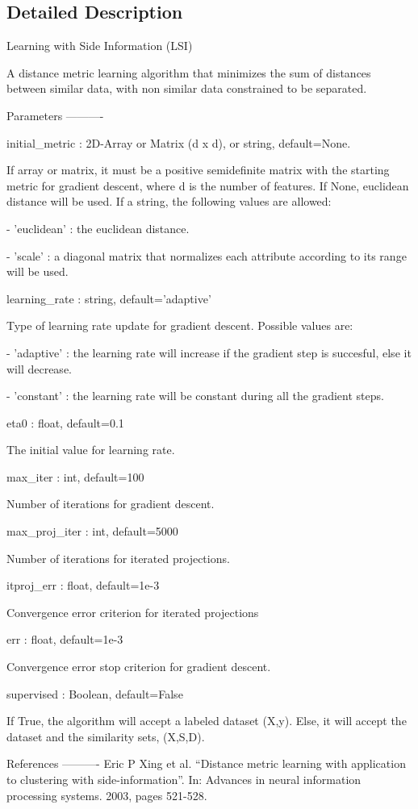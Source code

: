 \subsection{Detailed Description}
\begin{DoxyVerb}Learning with Side Information (LSI)

A distance metric learning algorithm that minimizes the sum of distances between similar data, with non similar
data constrained to be separated.

Parameters
----------

initial_metric : 2D-Array or Matrix (d x d), or string, default=None.

    If array or matrix, it must be a positive semidefinite matrix with the starting metric for gradient descent, where d is the number of features.
    If None, euclidean distance will be used. If a string, the following values are allowed:

    - 'euclidean' : the euclidean distance.

    - 'scale' : a diagonal matrix that normalizes each attribute according to its range will be used.

learning_rate : string, default='adaptive'

    Type of learning rate update for gradient descent. Possible values are:

    - 'adaptive' : the learning rate will increase if the gradient step is succesful, else it will decrease.

    - 'constant' : the learning rate will be constant during all the gradient steps.

eta0 : float, default=0.1

    The initial value for learning rate.

max_iter : int, default=100

    Number of iterations for gradient descent.

max_proj_iter : int, default=5000

    Number of iterations for iterated projections.

itproj_err : float, default=1e-3

    Convergence error criterion for iterated projections

err : float, default=1e-3

    Convergence error stop criterion for gradient descent.

supervised : Boolean, default=False

    If True, the algorithm will accept a labeled dataset (X,y). Else, it will accept the dataset and the similarity sets, (X,S,D).

References
----------
    Eric P Xing et al. “Distance metric learning with application to clustering with side-information”.
    In: Advances in neural information processing systems. 2003, pages 521-528.\end{DoxyVerb}
 

